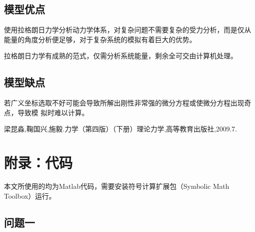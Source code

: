\documentclass[a4paper,c5size,twoside,UTF8]{ctexart} %
\numberwithin{equation}{section}   %
\begin{document}
\subsection{模型优点}
使用拉格朗日力学分析动力学体系，对复杂问题不需要复杂的受力分析，而是仅从能量的角度分析便足够，对于复杂系统的模拟有着巨大的优势。

拉格朗日力学有成熟的范式，仅需分析系统能量，剩余全可交由计算机处理。

\subsection{模型缺点}

若广义坐标选取不好可能会导致所解出刚性非常强的微分方程或使微分方程出现奇点，导致模
拟时难以计算。

\begin{thebibliography}{1}
	
	  梁昆淼,鞠国兴,施毅.力学（第四版）（下册）理论力学,高等教育出版社,2009.7.
   
\end{thebibliography}
   



\newpage

\section{附录：代码}

本文所使用的均为Matlab代码，需要安装符号计算扩展包（Symbolic Math Toolbox）运行。


\subsection{问题一}
\end{document}
